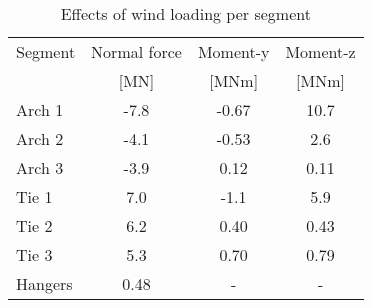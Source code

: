 \begin{table}[H] 
\caption{Effects of wind loading per segment}
\label{tab:effects_wind_load}
\centering
\begin{tabular}{lccc}
\hline
Segment & Normal force & Moment-y & Moment-z \\
 & [MN]   & [MNm] & [MNm] \\ \hline
Arch 1 & -7.8 & -0.67 & 10.7\\
Arch 2 & -4.1 & -0.53 & 2.6\\
Arch 3 & -3.9 & 0.12 & 0.11\\
Tie 1 & 7.0 & -1.1 & 5.9\\
Tie 2 & 6.2 & 0.40 & 0.43\\
Tie 3 & 5.3 & 0.70 & 0.79\\
Hangers & 0.48 & - & - \\ \hline
\end{tabular}
\end{table}
